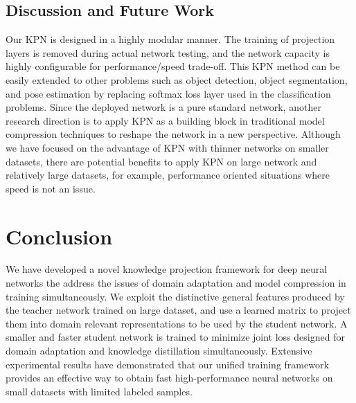 \documentclass[journal]{IEEEtran}
\begin{document}
\subsection{Discussion and Future Work}
Our KPN is designed in a highly modular manner. The training of projection layers is removed during actual network testing, and the network capacity is highly configurable for performance/speed trade-off. This KPN method can be easily extended to other problems such as object detection, object segmentation, and pose estimation by replacing softmax loss layer used in the  classification problems. Since the deployed network is a pure standard network, another research direction is to apply KPN as a building block in traditional model compression techniques to reshape the network in a new perspective. Although we have focused on the advantage of KPN with thinner networks on smaller datasets, there are  potential benefits to apply KPN on large network and relatively large datasets, for example, performance oriented situations where speed is not an issue. 


\section{Conclusion}
\label{sec:con}
We have developed a novel knowledge projection framework for deep neural networks the address the issues of domain adaptation and model compression in training simultaneously. We exploit the distinctive general features produced by the  teacher network trained on large dataset, and use a learned matrix to project them into domain relevant representations to be used by the student network. A smaller and faster student network is trained to minimize joint loss designed for domain adaptation and knowledge distillation simultaneously. Extensive experimental results have demonstrated that our unified training framework provides an effective way to obtain fast high-performance neural networks on small datasets
with limited labeled samples.















\ifCLASSOPTIONcaptionsoff
  \newpage
\fi















\end{document}
